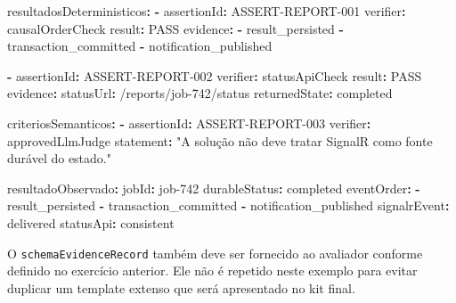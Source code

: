 \documentclass[
  10pt,
  a4paper,
  oneside]{book}
\newenvironment{Shaded}{}{}
\newcommand{\AttributeTok}[1]{\textcolor[rgb]{0.49,0.56,0.16}{#1}}
\newcommand{\FunctionTok}[1]{\textcolor[rgb]{0.02,0.16,0.49}{#1}}
\newcommand{\KeywordTok}[1]{\textcolor[rgb]{0.00,0.44,0.13}{\textbf{#1}}}
\newcommand{\StringTok}[1]{\textcolor[rgb]{0.25,0.44,0.63}{#1}}
\renewenvironment{Shaded}{\begin{snugshade}}{\end{snugshade}}%
\begin{document}
\begin{Shaded}
\begin{Highlighting}[]
\FunctionTok{resultadosDeterministicos}\KeywordTok{:}
\AttributeTok{  }\KeywordTok{{-}}\AttributeTok{ }\FunctionTok{assertionId}\KeywordTok{:}\AttributeTok{ ASSERT{-}REPORT{-}001}
\AttributeTok{    }\FunctionTok{verifier}\KeywordTok{:}\AttributeTok{ causalOrderCheck}
\AttributeTok{    }\FunctionTok{result}\KeywordTok{:}\AttributeTok{ PASS}
\AttributeTok{    }\FunctionTok{evidence}\KeywordTok{:}
\AttributeTok{      }\KeywordTok{{-}}\AttributeTok{ result\_persisted}
\AttributeTok{      }\KeywordTok{{-}}\AttributeTok{ transaction\_committed}
\AttributeTok{      }\KeywordTok{{-}}\AttributeTok{ notification\_published}

\AttributeTok{  }\KeywordTok{{-}}\AttributeTok{ }\FunctionTok{assertionId}\KeywordTok{:}\AttributeTok{ ASSERT{-}REPORT{-}002}
\AttributeTok{    }\FunctionTok{verifier}\KeywordTok{:}\AttributeTok{ statusApiCheck}
\AttributeTok{    }\FunctionTok{result}\KeywordTok{:}\AttributeTok{ PASS}
\AttributeTok{    }\FunctionTok{evidence}\KeywordTok{:}
\AttributeTok{      }\FunctionTok{statusUrl}\KeywordTok{:}\AttributeTok{ /reports/job{-}742/status}
\AttributeTok{      }\FunctionTok{returnedState}\KeywordTok{:}\AttributeTok{ completed}

\FunctionTok{criteriosSemanticos}\KeywordTok{:}
\AttributeTok{  }\KeywordTok{{-}}\AttributeTok{ }\FunctionTok{assertionId}\KeywordTok{:}\AttributeTok{ ASSERT{-}REPORT{-}003}
\AttributeTok{    }\FunctionTok{verifier}\KeywordTok{:}\AttributeTok{ approvedLlmJudge}
\AttributeTok{    }\FunctionTok{statement}\KeywordTok{:}\AttributeTok{ }\StringTok{"A solução não deve tratar SignalR como fonte durável do estado."}

\FunctionTok{resultadoObservado}\KeywordTok{:}
\AttributeTok{  }\FunctionTok{jobId}\KeywordTok{:}\AttributeTok{ job{-}742}
\AttributeTok{  }\FunctionTok{durableStatus}\KeywordTok{:}\AttributeTok{ completed}
\AttributeTok{  }\FunctionTok{eventOrder}\KeywordTok{:}
\AttributeTok{    }\KeywordTok{{-}}\AttributeTok{ result\_persisted}
\AttributeTok{    }\KeywordTok{{-}}\AttributeTok{ transaction\_committed}
\AttributeTok{    }\KeywordTok{{-}}\AttributeTok{ notification\_published}
\AttributeTok{  }\FunctionTok{signalrEvent}\KeywordTok{:}\AttributeTok{ delivered}
\AttributeTok{  }\FunctionTok{statusApi}\KeywordTok{:}\AttributeTok{ consistent}
\end{Highlighting}
\end{Shaded}

O \texttt{schemaEvidenceRecord} também deve ser fornecido ao avaliador
conforme definido no exercício anterior. Ele não é repetido neste
exemplo para evitar duplicar um template extenso que será apresentado no
kit final.
\end{document}
